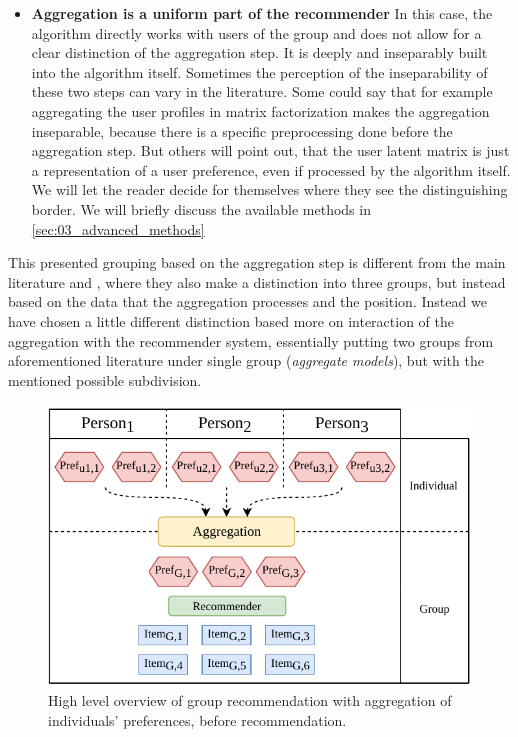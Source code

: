 \begin{itemize}
    \item \textbf{Aggregation is a uniform part of the recommender} \newline
    In this case, the algorithm directly works with users of the group and does not allow for a clear distinction of the aggregation step. It is deeply and inseparably built into the algorithm itself. Sometimes the perception of the inseparability of these two steps can vary in the literature. Some could say that for example aggregating the user profiles in matrix factorization makes the aggregation inseparable, because there is a specific preprocessing done before the aggregation step. But others will point out, that the user latent matrix is just a representation of a user preference, even if processed by the algorithm itself. We will let the reader decide for themselves where they see the distinguishing border. We will briefly discuss the available methods in \ref{sec:03_advanced_methods}
\end{itemize}


This presented grouping based on the aggregation step is different from the main literature  \cite{recommendations_to_groups-jameson2007} and \cite{grouprecommendersystems_felfernig2018group}, where they also make a distinction into three groups, but instead based on the data that the aggregation processes and the position. Instead we have chosen a little different distinction based more on interaction of the aggregation with the recommender system, essentially putting two groups from aforementioned literature under single group (\textit{aggregate models}), but with the mentioned possible subdivision.
    

\begin{figure}[htbp]
    \centering
    \includegraphics{img/before-rec-aggregation.pdf}
    \caption{High level overview of group recommendation with aggregation of individuals' preferences, before recommendation.}
    \label{fig:before_rec_agg}
\end{figure}

